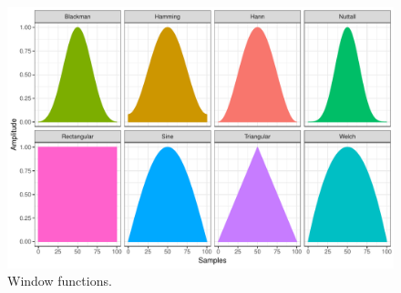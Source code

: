 
\begin{figure}[!h]
\centering
\includegraphics[width=.95\linewidth]{filters.pdf}
\caption{Window functions.}
\label{fig.filters}
\end{figure}